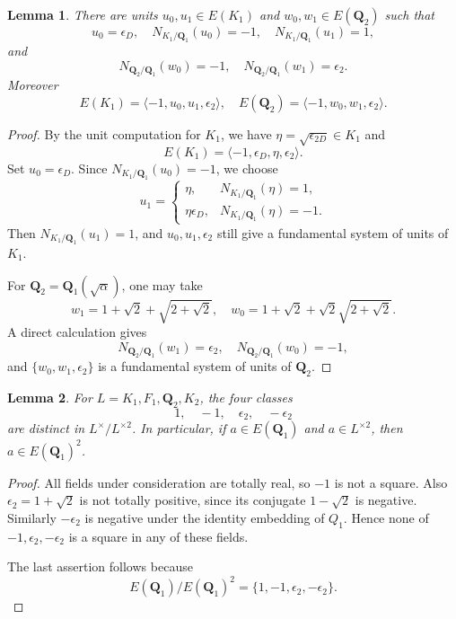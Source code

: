 \documentclass{article}
\numberwithin{equation}{section}
\theoremstyle{plain}  %
\newtheorem{lemma}{Lemma}[section]
\theoremstyle{definition}
\begin{document}
\begin{lemma}\label{lem:unit-normalizations-K1-Q2}
There are units $u_0,u_1 \in E(K_1)$ and $w_0,w_1 \in E(\mathbf Q_2)$ such that
$$
u_0=\epsilon_D, \quad N_{K_1/\mathbf Q_1}(u_0)=-1, \quad N_{K_1/\mathbf Q_1}(u_1)=1,
$$
and
$$
N_{\mathbf Q_2/\mathbf Q_1}(w_0)=-1, \quad N_{\mathbf Q_2/\mathbf Q_1}(w_1)=\epsilon_2.
$$
Moreover
$$
E(K_1)=\langle -1,u_0,u_1,\epsilon_2\rangle, \quad E(\mathbf Q_2)=\langle -1,w_0,w_1,\epsilon_2\rangle.
$$ 
\end{lemma}

\begin{proof}
By the unit computation for $K_1$, we have $\eta=\sqrt{\epsilon_{2D}} \in K_1$ and
$$
E(K_1)=\langle -1,\epsilon_D,\eta,\epsilon_2\rangle.
$$
Set $u_0=\epsilon_D$. Since $N_{K_1/\mathbf Q_1}(u_0)=-1$, we choose
$$
u_1=\begin{cases}
\eta, & N_{K_1/\mathbf Q_1}(\eta)=1,\\
\eta\epsilon_D, & N_{K_1/\mathbf Q_1}(\eta)=-1.
\end{cases}
$$
Then $N_{K_1/\mathbf Q_1}(u_1)=1$, and $u_0,u_1,\epsilon_2$ still give a fundamental system of units of $K_1$.

For $\mathbf Q_2=\mathbf Q_1(\sqrt \alpha)$, one may take
$$
w_1=1+\sqrt 2+\sqrt{2+\sqrt 2}, \quad w_0=1+\sqrt 2+\sqrt 2\sqrt{2+\sqrt 2}.
$$
A direct calculation gives
$$
N_{\mathbf Q_2/\mathbf Q_1}(w_1)=\epsilon_2, \quad N_{\mathbf Q_2/\mathbf Q_1}(w_0)=-1,
$$
and $\{w_0,w_1,\epsilon_2\}$ is a fundamental system of units of $\mathbf Q_2$.
\end{proof}

\begin{lemma}\label{lem:base-units-square-classes}
For $L=K_1,F_1,\mathbf Q_2,K_2$, the four classes
$$
1, \quad -1, \quad \epsilon_2, \quad -\epsilon_2
$$
are distinct in $L^\times/L^{\times 2}$.
In particular, if $a \in E(\mathbf Q_1)$ and $a \in L^{\times 2}$, then $a \in E(\mathbf Q_1)^2$.
\end{lemma}

\begin{proof}
All fields under consideration are totally real, so $-1$ is not a square. Also $\epsilon_2=1+\sqrt 2$ is not totally positive, since its conjugate $1-\sqrt 2$ is negative. Similarly $-\epsilon_2$ is negative under the identity embedding of $Q_1$. Hence none of $-1,\epsilon_2,-\epsilon_2$ is a square in any of these fields.

The last assertion follows because
$$
E(\mathbf Q_1)/E(\mathbf Q_1)^2=\{1,-1,\epsilon_2,-\epsilon_2\}.
$$
\end{proof}
\end{document}
